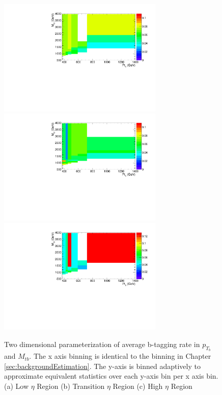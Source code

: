 \begin{figure}[htcb]
\begin{center}
\includegraphics[width=0.7\textwidth]{AN-13-004/figs/TagrateEta1SB2dSB1.pdf}
\includegraphics[width=0.7\textwidth]{AN-13-004/figs/TagrateEta2SB2dSB1.pdf}
\includegraphics[width=0.7\textwidth]{AN-13-004/figs/TagrateEta3SB2dSB1.pdf}
\caption{
Two dimensional parameterization of average b-tagging rate in $p_{T_{b}}$ and $M_{tb}$.  The x axis binning is identical to the binning in Chapter \ref{sec:backgroundEstimation}.  
The y-axis is binned adaptively to approximate equivalent statistics over each y-axis bin per x axis bin. 
(a) Low $\eta$ Region
(b) Transition $\eta$ Region
(c) High $\eta$ Region
}
\label{figs:sb2deta}
\end{center}
\end{figure}

